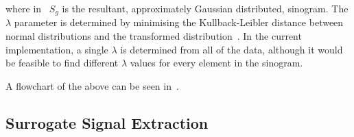                 \noindent where in~ $S_g$ is the resultant, approximately Gaussian distributed, sinogram. The $\lambda$ parameter is determined by minimising the Kullback-Leibler distance between normal distributions and the transformed distribution~. In the current implementation, a single $\lambda$ is determined from all of the data, although it would be feasible to find different $\lambda$ values for every element in the sinogram.
                
                A flowchart of the above can be seen in~.
            
            \subsection{Surrogate Signal Extraction} \label{sec:pca_data_driven_surrogate_signal_extraction_methods_for_dynamic_pet_methods_surrogate_signal_extraction}
